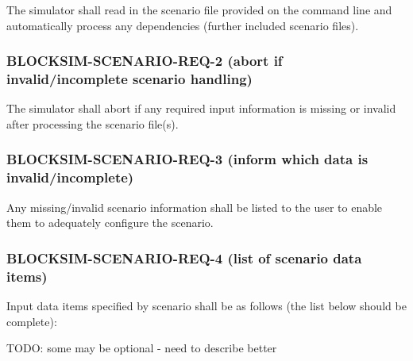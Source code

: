 \documentclass{scrreprt}
\begin{document}
        The simulator shall read in the scenario file provided on the command
        line and automatically process any dependencies (further included scenario
        files).

      \subsubsection{BLOCKSIM-SCENARIO-REQ-2 (abort if invalid/incomplete scenario handling)}

        The simulator shall abort if any required input information is missing
        or invalid after processing the scenario file(s).

      \subsubsection{BLOCKSIM-SCENARIO-REQ-3 (inform which data is invalid/incomplete)}

        Any missing/invalid scenario information shall be listed to the user to
        enable
        them to adequately configure the scenario.

      \subsubsection{BLOCKSIM-SCENARIO-REQ-4 (list of scenario data items)}

        Input data items specified by scenario shall be as follows
        (the list below should be complete):

        TODO: some may be optional - need to describe better
\end{document}
